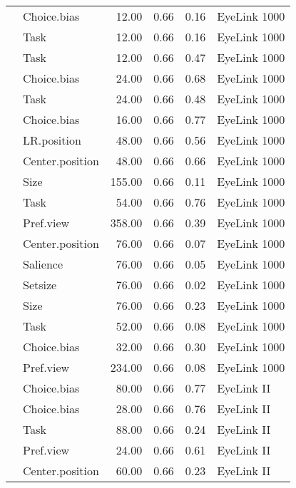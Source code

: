 \begin{longtable}{llrrrl}
  \cite{glaholt2009b} & Choice.bias & 12.00 & 0.66 & 0.16 & EyeLink 1000 \\ 
  \cite{glaholt2009b} & Task & 12.00 & 0.66 & 0.16 & EyeLink 1000 \\ 
  \cite{glaholt2009b} & Task & 12.00 & 0.66 & 0.47 & EyeLink 1000 \\ 
  \cite{glaholt2012} & Choice.bias & 24.00 & 0.66 & 0.68 & EyeLink 1000 \\ 
  \cite{glaholt2012} & Task & 24.00 & 0.66 & 0.48 & EyeLink 1000 \\ 
  \cite{glaholt2009c} & Choice.bias & 16.00 & 0.66 & 0.77 & EyeLink 1000 \\ 
  \cite{glaholt2010} & LR.position & 48.00 & 0.66 & 0.56 & EyeLink 1000 \\ 
  \cite{glaholt2010} & Center.position & 48.00 & 0.66 & 0.66 & EyeLink 1000 \\ 
  \cite{graham2016} & Size & 155.00 & 0.66 & 0.11 & EyeLink 1000 \\ 
  \cite{leboeuf2016} & Task & 54.00 & 0.66 & 0.76 & EyeLink 1000 \\ 
  \cite{miller2015} & Pref.view & 358.00 & 0.66 & 0.39 & EyeLink 1000 \\ 
  \cite{orquin2019a} & Center.position & 76.00 & 0.66 & 0.07 & EyeLink 1000 \\ 
  \cite{orquin2019a} & Salience & 76.00 & 0.66 & 0.05 & EyeLink 1000 \\ 
  \cite{orquin2019a} & Setsize & 76.00 & 0.66 & 0.02 & EyeLink 1000 \\ 
  \cite{orquin2019a} & Size & 76.00 & 0.66 & 0.23 & EyeLink 1000 \\ 
  \cite{orquin2019a} & Task & 52.00 & 0.66 & 0.08 & EyeLink 1000 \\ 
  \cite{schotter2012a} & Choice.bias & 32.00 & 0.66 & 0.30 & EyeLink 1000 \\ 
  \cite{wolfson2017} & Pref.view & 234.00 & 0.66 & 0.08 & EyeLink 1000 \\ 
  \cite{brandstatter2014} & Choice.bias & 80.00 & 0.66 & 0.77 & EyeLink II \\ 
  \cite{folke2016} & Choice.bias & 28.00 & 0.66 & 0.76 & EyeLink II \\ 
  \cite{huang2011} & Task & 88.00 & 0.66 & 0.24 & EyeLink II \\ 
  \cite{kim2012a} & Pref.view & 24.00 & 0.66 & 0.61 & EyeLink II \\ 
  \cite{meissner2016a} & Center.position & 60.00 & 0.66 & 0.23 & EyeLink II \\ 

\end{longtable}
